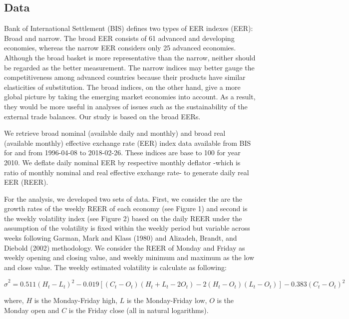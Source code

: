 \documentclass[]{elsarticle} %
\begin{document}
\subsection{\texorpdfstring{\textbf{Data}}{Data}}\label{data}

Bank of International Settlement (BIS) defines two types of EER indexes
(EER): Broad and narrow. The broad EER consists of 61 advanced and
developing economies, whereas the narrow EER considers only 25 advanced
economies. Although the broad basket is more representative than the
narrow, neither should be regarded as the better measurement. The narrow
indices may better gauge the competitiveness among advanced countries
because their products have similar elasticities of substitution. The
broad indices, on the other hand, give a more global picture by taking
the emerging market economies into account. As a result, they would be
more useful in analyses of issues such as the sustainability of the
external trade balances. Our study is based on the broad EERs.

We retrieve broad nominal (available daily and monthly) and broad real
(available monthly) effective exchange rate (EER) index data available
from BIS for and from 1996-04-08 to 2018-02-26. These indices are base
to 100 for year 2010. We deflate daily nominal EER by respective monthly
deflator -which is ratio of monthly nominal and real effective exchange
rate- to generate daily real EER (REER).

For the analysis, we developed two sets of data. First, we consider the
are the growth rates of the weekly REER of each economy (see Figure 1)
and second is the weekly volatility index (see Figure 2) based on the
daily REER under the assumption of the volatility is fixed within the
weekly period but variable across weeks following Garman, Mark and Klass
(1980) and Alizadeh, Brandt, and Diebold (2002) methodology. We consider
the REER of Monday and Friday as weekly opening and closing value, and
weekly minimum and maximum as the low and close value. The weekly
estimated volatility is calculate as following:

\[{{\hat{\sigma }}^{2}}=0.511{{\left( {{H}_{t}}-{{L}_{t}} \right)}^{2}}-0.019\left[ \left( {{C}_{t}}-{{O}_{t}} \right)\left( {{H}_{t}}+{{L}_{t}}-2{{O}_{t}} \right)-2\left( {{H}_{t}}-{{O}_{t}} \right)\left( {{L}_{t}}-{{O}_{t}} \right) \right]-0.383{{\left( {{C}_{t}}-{{O}_{t}} \right)}^{2}}\]

where, \(H\) is the Monday-Friday high, \(L\) is the Monday-Friday low,
\(O\) is the Monday open and \(C\) is the Friday close (all in natural
logarithms).
\end{document}
